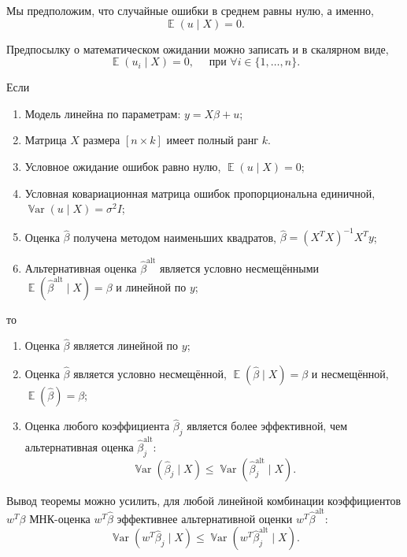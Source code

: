 \documentclass[12pt]{article}
\DeclareMathOperator{\Var}{\mathbb{V}ar}
\DeclareMathOperator{\E}{\mathbb{E}}
\renewcommand{\b}{\beta}
\newcommand{\hb}{\hat{\beta}}
\renewcommand{\u}{u}
\newcommand{\alt}{\text{alt}}
\begin{document}
Мы предположим, что случайные ошибки в среднем равны нулю, а именно,
\[
\E(\u \mid X) = 0.
\]

Предпосылку о математическом ожидании можно записать и в скалярном виде,
\[
\E(\u_i \mid X) = 0, \quad \text{ при } \forall i \in \{1, \dots, n\}.
\]


\begin{theorem}
Если 
\begin{enumerate}
    \item Модель линейна по параметрам: $y = X\b + u$;
    \item Матрица $X$ размера $[n \times k]$ имеет полный ранг $k$.
    \item Условное ожидание ошибок равно нулю, $\E(\u \mid X) = 0$;
    \item Условная ковариационная матрица ошибок пропорциональна единичной, $\Var(\u \mid X) = \sigma^2 I$;
    \item Оценка $\hb$ получена методом наименьших квадратов, $\hb = (X^T X)^{-1}X^T y$;
    \item Альтернативная оценка $\hb^{\alt}$ является условно несмещёнными $\E(\hb^{\alt} \mid X) = \b$
    и линейной по $y$;
\end{enumerate}
то
\begin{enumerate}
    \item Оценка $\hb$ является линейной по $y$;
    \item Оценка $\hb$ является условно несмещённой, $\E(\hb \mid X) = \b$ и несмещённой, $\E(\hb) = \b$;
    \item Оценка любого коэффициента $\hb_j$ является более эффективной, чем альтернативная оценка $\hb_j^{\alt}$:
\[
\Var(\hb_j \mid X) \leq \Var(\hb^{\alt}_j \mid X).
\]
\end{enumerate}
\end{theorem}

Вывод теоремы можно усилить, для любой линейной комбинации коэффициентов $w^T \b$ МНК-оценка $w^T \hb$ эффективнее альтернативной оценки $w^T \hb^{\alt}$:
\[
\Var(w^T\hb_j \mid X) \leq \Var(w^T \hb^{\alt}_j \mid X).
\]
\end{document}
